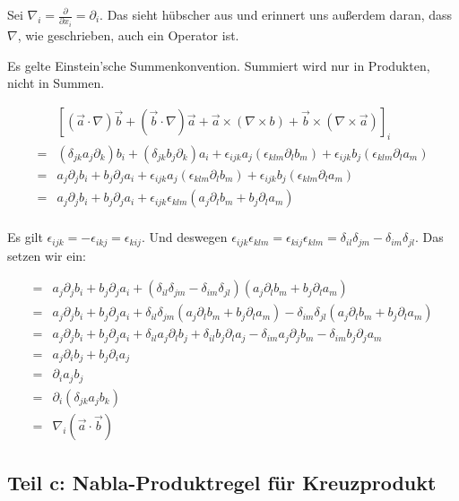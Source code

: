 \documentclass[a4paper,german,12pt,smallheadings]{scrartcl}
\begin{document}
Sei $\nabla_i = \frac{\partial}{\partial x_i} = \partial_i$. Das sieht hübscher
aus und erinnert uns außerdem daran, dass $\nabla$, wie geschrieben, auch ein
Operator ist.

Es gelte Einstein'sche Summenkonvention. Summiert wird nur in Produkten, nicht in Summen.

\begin{align*}
  &\left[(\vec{a}\cdot\nabla)\vec{b} + (\vec{b}\cdot\nabla)\vec{a} + \vec{a} \times (\nabla \times b) + \vec{b} \times (\nabla \times \vec{a})\right]_i\\
  =&(\delta_{jk}a_j\partial_k)b_i + (\delta_{jk}b_j\partial_k)a_i + \epsilon_{ijk}a_j(\epsilon_{klm}\partial_lb_m) + \epsilon_{ijk} b_j (\epsilon_{klm} \partial_l a_m)\\
  =&a_j\partial_jb_i + b_j\partial_ja_i + \epsilon_{ijk}a_j(\epsilon_{klm}\partial_lb_m) + \epsilon_{ijk} b_j (\epsilon_{klm} \partial_l a_m)\\
  =&a_j\partial_jb_i + b_j\partial_ja_i + \epsilon_{ijk}\epsilon_{klm} (a_j\partial_lb_m + b_j\partial_l a_m)\\
\end{align*}

Es gilt $\epsilon_{ijk} = -\epsilon_{ikj} = \epsilon_{kij}$. Und deswegen
$\epsilon_{ijk}\epsilon_{klm} = \epsilon_{kij}\epsilon_{klm} =
\delta_{il}\delta_{jm} - \delta_{im}\delta_{jl}$. Das setzen wir ein:

\begin{align*}
  =&a_j\partial_jb_i + b_j\partial_ja_i + (\delta_{il}\delta_{jm} - \delta_{im}\delta_{jl}) (a_j\partial_lb_m + b_j\partial_l a_m)\\
  =&a_j\partial_jb_i + b_j\partial_ja_i + \delta_{il}\delta_{jm}(a_j\partial_lb_m + b_j\partial_l a_m) - \delta_{im}\delta_{jl}(a_j\partial_lb_m + b_j\partial_l a_m)\\
  =&a_j\partial_jb_i + b_j\partial_ja_i + \delta_{il}a_j\partial_lb_j + \delta_{il}b_j\partial_l a_j - \delta_{im}a_j\partial_jb_m - \delta_{im}b_j\partial_j a_m\\
  =&a_j\partial_ib_j + b_j\partial_i a_j\\
  =&\partial_ia_jb_j\\
  =&\partial_i(\delta_{jk}a_jb_k)\\
  =&\nabla_i(\vec{a} \cdot \vec{b})
\end{align*}

\subsection*{Teil c: Nabla-Produktregel für Kreuzprodukt}
\end{document}
